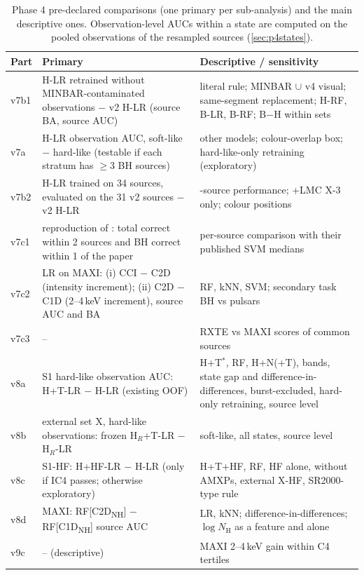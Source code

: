 \begin{table}[htbp]
\centering\footnotesize
\caption[Phase 4 pre-registered comparisons]{Phase 4 pre-declared comparisons (one primary per sub-analysis) and the main
descriptive ones. Observation-level AUCs within a state are computed on the pooled observations of the resampled sources
(\cref{sec:p4states}).}
\label{tab:p4prereg}
\begin{tabularx}{\textwidth}{@{}p{1.2cm}>{\raggedright\arraybackslash}p{5.6cm}>{\raggedright\arraybackslash}X@{}}
\toprule
Part & Primary & Descriptive / sensitivity \\
\midrule
v7b1 & H-LR retrained without MINBAR-contaminated observations $-$ v2 H-LR (source BA, source AUC) & literal rule; MINBAR $\cup$ v4 visual; same-segment replacement; H-RF, B-LR, B-RF; B$-$H within sets \\
v7a & H-LR observation AUC, soft-like $-$ hard-like (testable if each stratum has $\ge3$ BH sources) & other models; colour-overlap box; hard-like-only retraining (exploratory) \\
v7b2 & H-LR trained on 34 sources, evaluated on the 31 v2 sources $-$ v2 H-LR & 34-source performance; +LMC X-3 only; colour positions \\
v7c1 & reproduction of \citet{deBeurs2022}: total correct within 2 sources and BH correct within 1 of the paper & per-source comparison with their published SVM medians \\
v7c2 & LR on MAXI: (i) CCI $-$ C2D (intensity increment); (ii) C2D $-$ C1D (2--4\,keV increment), source AUC and BA & RF, kNN, SVM; secondary task BH vs pulsars \\
v7c3 & -- & RXTE vs MAXI scores of common sources \\
v8a & S1 hard-like observation AUC: H+T-LR $-$ H-LR (existing OOF) & H+T$^*$, RF, H+N(+T), bands, state gap and difference-in-differences, burst-excluded, hard-only retraining, source level \\
v8b & external set X, hard-like observations: frozen H$_R$+T-LR $-$ H$_R$-LR & soft-like, all states, source level \\
v8c & S1-HF: H+HF-LR $-$ H-LR (only if IC4 passes; otherwise exploratory) & H+T+HF, RF, HF alone, without AMXPs, external X-HF, SR2000-type rule \\
v8d & MAXI: RF[C2D\textsubscript{NH}] $-$ RF[C1D\textsubscript{NH}] source AUC & LR, kNN; difference-in-differences; $\log N_\mathrm{H}$ as a feature and alone \\
v9c & -- (descriptive) & MAXI 2--4\,keV gain within C4 tertiles \\
\bottomrule
\end{tabularx}
\end{table}

